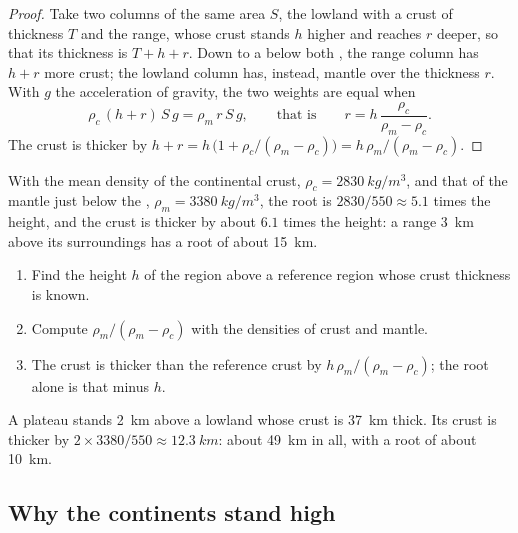 \begin{proof}
Take two columns of the same area $S$, the lowland with a crust of thickness
$T$ and the range, whose crust stands $h$ higher and reaches $r$ deeper, so
that its thickness is $T + h + r$. Down to a  below both
, the range column has $h + r$ more crust; the lowland column has,
instead, mantle over the thickness $r$. With $g$ the acceleration of gravity,
the two weights are equal when
\[
  \rho_c\,(h + r)\,S\,g = \rho_m\,r\,S\,g,
  \qquad\text{that is}\qquad
  r = h\,\frac{\rho_c}{\rho_m - \rho_c}.
\]
The crust is thicker by $h + r = h\,\bigl(1 + \rho_c/(\rho_m - \rho_c)\bigr)
= h\,\rho_m/(\rho_m - \rho_c)$.
\end{proof}

With the mean density of the continental crust, $\rho_c =
\qty{2830}{kg/m^3}$, and that of the mantle just below the , $\rho_m =
\qty{3380}{kg/m^3}$, the root is $2830/550 \approx 5.1$ times the height,
and the crust is thicker by about $6.1$ times the height: a range
\qty{3}{km} above its surroundings has a root of about \qty{15}{km}.

\begin{method}\label{met:g11:lithosphere-asthenosphere:root}
\begin{enumerate}
  \item Find the height $h$ of the region above a reference region whose crust
        thickness is known.
  \item Compute $\rho_m/(\rho_m - \rho_c)$ with the densities of crust and
        mantle.
  \item The crust is thicker than the reference crust by $h\,\rho_m/(\rho_m -
        \rho_c)$; the root alone is that minus $h$.
\end{enumerate}
\end{method}

\begin{example}\label{ex:g11:lithosphere-asthenosphere:plateau}
A plateau stands \qty{2}{km} above a lowland whose crust is \qty{37}{km}
thick. Its crust is thicker by $2 \times 3380/550 \approx \qty{12.3}{km}$:
about \qty{49}{km} in all, with a root of about \qty{10}{km}.
\end{example}

\subsection{Why the continents stand high}

